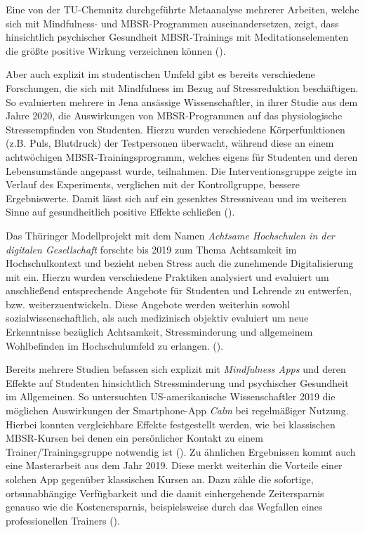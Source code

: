 \documentclass[10pt]{article}
\newcommand{\zit}[1]{(\cite{#1})}
\begin{document}
Eine von der TU-Chemnitz durchgeführte Metaanalyse mehrerer  Arbeiten, welche sich mit Mindfulness- und MBSR-Programmen auseinandersetzen, zeigt, dass hinsichtlich psychischer Gesundheit MBSR-Trainings mit Meditationselementen die größte positive Wirkung verzeichnen können \zit{MindfulnessStudy2}.

Aber auch explizit im studentischen Umfeld gibt es bereits verschiedene Forschungen, die sich mit Mindfulness im Bezug auf Stressreduktion beschäftigen. So evaluierten mehrere in Jena ansässige Wissenschaftler, in ihrer Studie aus dem Jahre 2020, die Auswirkungen von MBSR-Programmen auf das physiologische Stressempfinden von Studenten. Hierzu wurden verschiedene Körperfunktionen (z.B. Puls, Blutdruck) der Testpersonen überwacht, während diese an einem achtwöchigen MBSR-Trainingsprogramm, welches eigens für Studenten und deren Lebensumstände angepasst wurde, teilnahmen. Die Interventionsgruppe zeigte im Verlauf des Experiments, verglichen mit der Kontrollgruppe, bessere Ergebniswerte. Damit lässt sich auf ein gesenktes Stressniveau und im weiteren Sinne auf gesundheitlich positive Effekte schließen \zit{MindfulnessStudy3}.

Das Thüringer Modellprojekt mit dem Namen \textit{Achtsame Hochschulen in der digitalen Gesellschaft} forschte bis 2019 zum Thema Achtsamkeit im Hochschulkontext und bezieht neben Stress auch die zunehmende Digitalisierung mit ein. Hierzu wurden verschiedene Praktiken analysiert und evaluiert um anschließend entsprechende Angebote für Studenten und Lehrende zu entwerfen, bzw. weiterzuentwickeln. Diese Angebote werden weiterhin sowohl sozialwissenschaftlich, als auch medizinisch objektiv evaluiert um neue Erkenntnisse bezüglich Achtsamkeit, Stressminderung und allgemeinem Wohlbefinden im Hochschulumfeld zu erlangen.  \zit{AchtsameHochschulen}.

Bereits mehrere Studien befassen sich explizit mit \textit{Mindfulness Apps} und deren Effekte auf Studenten hinsichtlich Stressminderung und psychischer Gesundheit im Allgemeinen. So untersuchten US-amerikanische Wissenschaftler 2019 die möglichen Auswirkungen der Smartphone-App \textit{Calm} bei regelmäßiger Nutzung. Hierbei konnten vergleichbare Effekte festgestellt werden, wie bei klassischen MBSR-Kursen bei denen ein persönlicher Kontakt zu einem Trainer/Trainingsgruppe notwendig ist \zit{MindfulnessStudy4}. Zu ähnlichen Ergebnissen kommt auch eine Masterarbeit aus dem Jahr 2019. Diese merkt weiterhin die Vorteile einer solchen App gegenüber klassischen Kursen an. Dazu zähle die sofortige, ortsunabhängige Verfügbarkeit und die damit einhergehende Zeitersparnis genauso wie die Kostenersparnis, beispielsweise durch das Wegfallen eines professionellen Trainers \zit{MindfulnessStudy5}.
\end{document}
